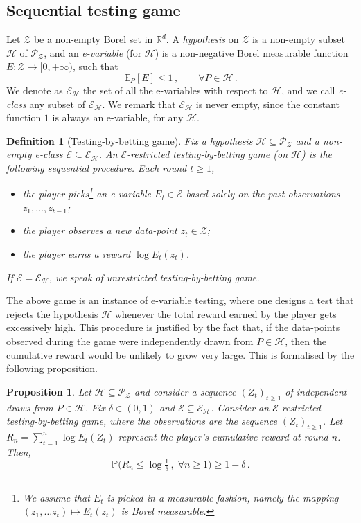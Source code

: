 \documentclass[3p, authoryear, 10pt]{elsarticle}%
\newcommand{\E}{\mathbb E}
\newcommand{\Ee}{\mathcal E}
\newcommand{\Hh}{\mathcal H}
\newcommand{\Pp}{\mathbb P}
\newcommand{\PR}{\mathcal P}
\newcommand{\R}{\mathbb R}
\newcommand{\Z}{\mathcal Z}
\newtheorem{definition}{Definition}
\newtheorem{proposition}{Proposition}
\begin{document}
\subsection{Sequential testing game}
Let $\Z$ be a non-empty Borel set in $\R^d$. A \emph{hypothesis} on $\Z$ is a non-empty subset $\Hh$ of $\PR_\Z$, and an \emph{e-variable} (for $\Hh$) is a non-negative Borel measurable function $E:\Z\to[0,+\infty)$, such that
$$\E_P[ E] \leq 1\,,\qquad\forall P\in\Hh\,.$$
We denote as $\Ee_\Hh$ the set of all the e-variables with respect to $\Hh$, and we call \emph{e-class} any subset of $\Ee_\Hh$. We remark that $\Ee_\Hh$ is never empty, since the constant function $1$ is always an e-variable, for any $\Hh$.

\begin{definition}[Testing-by-betting game]\label{def:game}
    Fix a hypothesis $\Hh\subseteq\PR_{\Z}$ and a non-empty e-class $\Ee\subseteq\Ee_\Hh$. An \emph{$\Ee$-restricted testing-by-betting game} (on $\Hh$) is the following sequential procedure. Each round $t\geq 1$, 
    \begin{itemize}\setlength{\itemsep}{0pt}
        \item the player picks\footnote{We assume that $E_t$ is picked in a measurable fashion, namely the mapping $(z_1,\dots z_t)\mapsto E_t(z_t)$ is Borel measurable.} an e-variable $E_t\in\Ee$ based solely on the past observations $z_1,\dots, z_{t-1}$;
        \item the player observes a new data-point $z_t\in\Z$;
        \item the player earns a reward $\log E_t(z_t)$. 
    \end{itemize}
    If $\Ee=\Ee_\Hh$, we speak of \emph{unrestricted} testing-by-betting game.
\end{definition}
The above game is an instance of e-variable testing, where one designs a test that rejects the hypothesis $\Hh$ whenever the total reward earned by the player gets excessively high. This procedure is justified by the fact that, if the data-points observed during the game were independently drawn from  $P \in \Hh$, then the cumulative reward would be unlikely to grow very large. This is formalised by the following proposition.
\begin{proposition}\label{lemma:game}
    Let $\Hh\subseteq\PR_{\Z}$ and consider a sequence $(Z_t)_{t\geq 1}$ of independent draws from  $P\in\Hh$. Fix $\delta\in(0,1)$ and $\Ee \subseteq \Ee_\Hh$. Consider an $\Ee$-restricted testing-by-betting game, where the observations are the sequence $(Z_t)_{t\geq 1}$. Let $R_n=\sum_{t=1}^n\log E_t(Z_t)$ represent the player's cumulative reward at round $n$. Then,
    $$\Pp\big(R_n\leq\log\tfrac{1}{\delta}\,,\;\forall n\geq 1\big)\geq 1-\delta\,.$$
\end{proposition}
\end{document}
